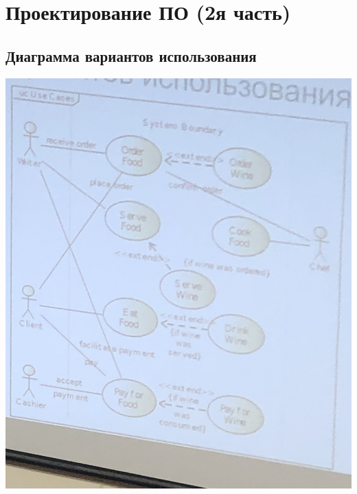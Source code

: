 \documentclass[12pt; a4paper]{book}
\begin{document}
\section{Проектирование ПО (2я часть)}
\subsection{Диаграмма вариантов использования}
\includegraphics[angle=0, width=\textwidth]{IMG/diagr_var_isp.jpg} 
\end{document}
